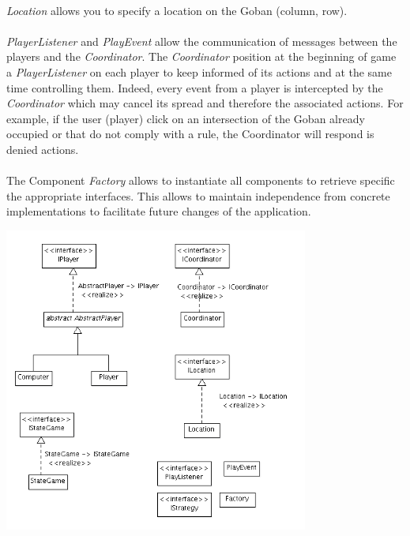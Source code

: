 \documentclass[a4paper,12pt]{report}
\begin{document}
	  \paragraph*{}
	  \textit{Location} allows you to specify a location on the Goban (column, row).
	  \paragraph*{}
	  \textit{PlayerListener} and \textit{PlayEvent} allow the communication of messages between the players and the \textit{Coordinator}.
	  The \textit{Coordinator} position at the beginning of game a \textit{PlayerListener} on each player to keep informed of its actions and at the same time controlling them.
	  Indeed, every event from a player is intercepted by the \textit{Coordinator} which may cancel its spread and therefore the associated actions.
	  For example, if the user (player) click on an intersection of the Goban already occupied or that do not comply with a rule, the Coordinator will respond is denied actions.
	  \paragraph*{}
	  The Component \textit{Factory} allows to instantiate all components to retrieve specific the appropriate interfaces.
	  This allows to maintain independence from concrete implementations to facilitate future changes of the application.

	  \begin{center}
		\includegraphics[width=0.75\textwidth]{img_rapport/designing_4.png}
	  \end{center}
\end{document}

